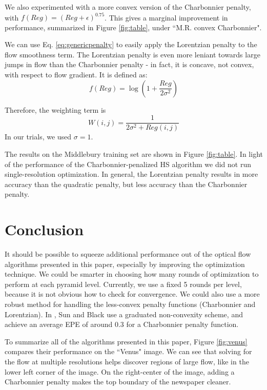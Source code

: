 \documentclass[10pt,twocolumn,letterpaper]{article}
\begin{document}
We also experimented with a more convex version of the Charbonnier penalty, with $f(Reg) = (Reg + \epsilon)^{0.75}$.  This gives a marginal improvement in performance, summarized in Figure \ref{fig:table}, under ``M.R. convex Charbonnier".

We can use Eq. \ref{eq:genericpenalty} to easily apply the Lorentzian penalty to the flow smoothness term.  The Lorentzian penalty is even more leniant towards large jumps in flow than the Charbonnier penalty - in fact, it is concave, not convex, with respect to flow gradient.  It is defined as:
\begin{equation} \label{eq:lor}
f(Reg) = \log(1 + \frac{Reg}{2 \sigma^2})
\end{equation}

Therefore, the weighting term is
\begin{equation} \label{eq:lorweight}
W(i,j) = \frac{1}{2 \sigma^2 + Reg(i,j)}
\end{equation}
In our trials, we used $\sigma=1$.

The results on the Middlebury training set are shown in Figure \ref{fig:table}.  In light of the performance of the Charbonnier-penalized HS algorithm we did not run single-resolution optimization.  In general, the Lorentzian penalty results in more accuracy than the quadratic penalty, but less accuracy than the Charbonnier penalty.  

\section{Conclusion}

It should be possible to squeeze additional performance out of the optical flow algorithms presented in this paper, especially by improving the optimization technique.  We could be smarter in choosing how many rounds of optimization to perform at each pyramid level.  Currently, we use a fixed 5 rounds per level, because it is not obvious how to check for convergence.  We could also use a more robust method for handling the less-convex penalty functions (Charbonnier and Lorentzian).  In \cite{sun}, Sun and Black use a graduated non-convexity scheme, and achieve an average EPE of around 0.3 for a Charbonnier penalty function.

To summarize all of the algorithms presented in this paper, Figure \ref{fig:venus} compares their performance on the ``Venus" image.  We can see that solving for the flow at multiple resolutions helps discover regions of large flow, like in the lower left corner of the image.  On the right-center of the image, adding a Charbonnier penalty makes the top boundary of the newspaper cleaner.
\end{document}
